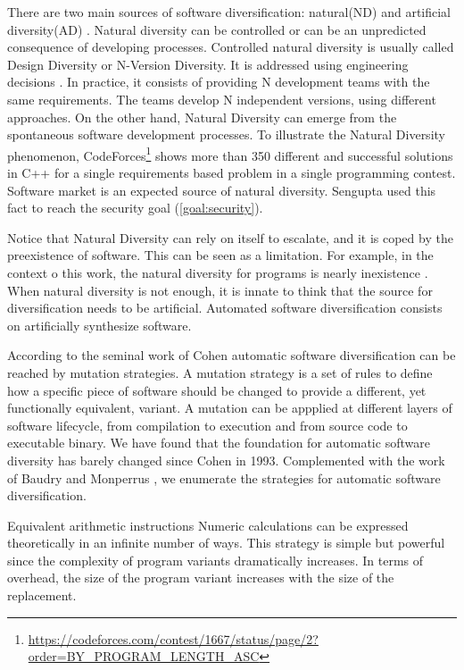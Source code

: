 There are two main sources of software diversification: natural(ND) and artificial diversity(AD) \cite{natural_diversity}. Natural diversity can be controlled or can be an unpredicted consequence of developing processes. Controlled natural diversity is usually called Design Diversity or N-Version Diversity. It is addressed using engineering decisions \cite{1659219}. In practice, it consists of providing N development teams with the same requirements. The teams develop N independent versions, using different approaches. On the other hand, Natural Diversity can emerge from the spontaneous software development processes. To illustrate the Natural Diversity phenomenon, CodeForces\footnote{\url{https://codeforces.com/contest/1667/status/page/2?order=BY_PROGRAM_LENGTH_ASC}} shows more than 350 different and successful solutions in C++ for a single requirements based problem in a single programming contest. 
Software market is an expected source of natural diversity. Sengupta \etal \cite{10.5555/3091125.3091155} used this fact to reach the security goal (\autoref{goal:security}).


Notice that Natural Diversity can rely on itself to escalate, and it is coped by the preexistence of software. This can be seen as a limitation. For example, in the context o this work, the natural diversity for \wasm programs is nearly inexistence \cite{Hilbig2021AnES}. When natural diversity is not enough, it is innate to think that the source for diversification needs to be artificial. Automated software diversification consists on artificially synthesize software.

According to the seminal work of Cohen \etal \cite{cohen1993operating} automatic software diversification can be reached by mutation strategies. A mutation strategy is a set of rules to define how a specific piece of software should be changed to provide a different, yet functionally equivalent, variant. A mutation can be appplied at different layers of software lifecycle, from compilation to execution and from source code to executable binary. We have found that the foundation for automatic software diversity has barely changed since Cohen in 1993. Complemented with the work of Baudry and Monperrus \cite{natural_diversity}, we enumerate the strategies for automatic software diversification. 

\begin{strategy}{Equivalent arithmetic instructions}
    \label{strategy:S1}
    \normalfont
    Numeric calculations can be expressed theoretically in an infinite number of ways. This strategy is simple but powerful since the complexity of program variants dramatically increases. In terms of overhead, the size of the program variant increases with the size of the replacement. 
    
\end{strategy}


